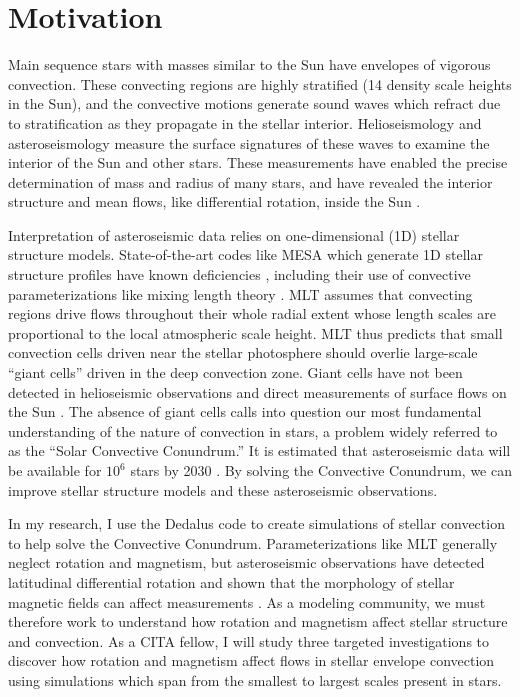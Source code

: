 \documentclass[preprint, hmargin=1in, vmargin=1in]{aastex62}
\begin{document}
\maketitle
\vspace{-88pt}
\section*{\textbf{Motivation}}
\thispagestyle{fancy}
Main sequence stars with masses similar to the Sun have envelopes of vigorous convection.
These convecting regions are highly stratified (14 density scale heights in the Sun), and the convective motions generate sound waves which refract due to stratification as they propagate in the stellar interior.
Helioseismology and asteroseismology measure the surface signatures of these waves to examine the interior of the Sun and other stars.
These measurements have enabled the precise determination of mass and radius of many stars, and have revealed the interior structure and mean flows, like differential rotation, inside the Sun \citep{huber&all2019, christensen-dalsgaard2002}.


Interpretation of asteroseismic data relies on one-dimensional (1D) stellar structure models. 
State-of-the-art codes like MESA \citep{paxton&all2011} which generate 1D stellar structure profiles have known deficiencies \citep{buldgen2019}, including their use of convective parameterizations like mixing length theory \citep[MLT,][]{bohm-vitense1958}.
MLT assumes that convecting regions drive flows throughout their whole radial extent whose length scales are proportional to the local atmospheric scale height.
MLT thus predicts that small convection cells driven near the stellar photosphere should overlie large-scale ``giant cells'' driven in the deep convection zone.
Giant cells have not been detected in helioseismic observations and direct measurements of surface flows on the Sun \citep{hanasoge&all2015, hathaway&all2015}.
The absence of giant cells calls into question our most fundamental understanding of the nature of convection in stars, a problem widely referred to as the ``Solar Convective Conundrum.''
It is estimated that asteroseismic data will be available for $10^6$ stars by 2030 \citep{huber&all2019}.
By solving the Convective Conundrum, we can improve stellar structure models and these asteroseismic observations.

In my research, I use the Dedalus code \citep{burns&all2019} to create simulations of stellar convection to help solve the Convective Conundrum.
Parameterizations like MLT generally neglect rotation and magnetism, but asteroseismic observations have detected latitudinal differential rotation \citep{benomar&all2018} and shown that the morphology of stellar magnetic fields can affect measurements \citep{santos&all2018}.
As a modeling community, we must therefore work to understand how rotation and magnetism affect stellar structure and convection.
As a CITA fellow, I will study three targeted investigations to discover how rotation and magnetism affect flows in stellar envelope convection using simulations which span from the smallest to largest scales present in stars.
\end{document}
